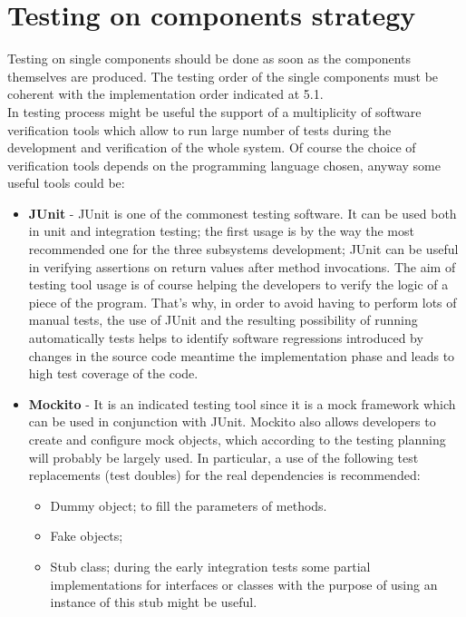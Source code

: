 \section{Testing on components strategy}
Testing on single components should be done as soon as the components themselves are produced. The testing order of the single components must be coherent with the implementation order indicated at 5.1. \\ 
In testing process might be useful the support of a multiplicity of software verification tools which allow to run large number of tests during the development and verification of the whole system. Of course the choice of verification tools depends on the programming language chosen, anyway some useful tools could be:
\begin{itemize}
\item \textbf{JUnit} - JUnit is one of the commonest testing software. It can be used both in unit and integration testing; the first usage is by the way the most recommended one for the three subsystems development; JUnit can be useful in verifying assertions on return values after method invocations. The aim of testing tool usage is of course helping the developers to verify the logic of a piece of the program. That's why, in order to avoid having to perform lots of manual tests, the use of JUnit and the resulting possibility of running automatically tests helps to identify software regressions introduced by changes in the source code meantime the implementation phase and leads to high test coverage of the code.

\item \textbf{Mockito} - It is an indicated testing tool since it is a mock framework which can be used in conjunction with JUnit. Mockito also allows developers to create and configure mock objects, which according to the testing planning will probably be largely used. In particular, a use of the following test replacements (test doubles) for the real dependencies is recommended:
\begin{itemize}
\item Dummy object; to fill the parameters of methods.

\item Fake objects; 

\item Stub class; during the early integration tests some partial implementations for interfaces or classes with the purpose of using an instance of this stub might be useful.


\end{itemize}
\end{itemize}
